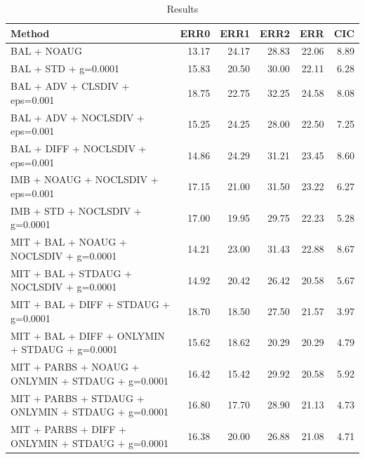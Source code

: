 \begin{table}
\caption{Results}
\label{tab:Results}
\begin{tabular}{lrrrrr}
\toprule
Method & ERR0 & ERR1 & ERR2 & ERR & CIC \\
\midrule
BAL + NOAUG & 13.17 & 24.17 & 28.83 & 22.06 & 8.89 \\
BAL + STD + g=0.0001 & 15.83 & 20.50 & 30.00 & 22.11 & 6.28 \\
BAL + ADV + CLSDIV + eps=0.001 & 18.75 & 22.75 & 32.25 & 24.58 & 8.08 \\
BAL + ADV + NOCLSDIV + eps=0.001 & 15.25 & 24.25 & 28.00 & 22.50 & 7.25 \\
BAL + DIFF + NOCLSDIV + eps=0.001 & 14.86 & 24.29 & 31.21 & 23.45 & 8.60 \\
IMB + NOAUG + NOCLSDIV + eps=0.001 & 17.15 & 21.00 & 31.50 & 23.22 & 6.27 \\
IMB + STD + NOCLSDIV + g=0.0001 & 17.00 & 19.95 & 29.75 & 22.23 & 5.28 \\
MIT + BAL + NOAUG + NOCLSDIV + g=0.0001 & 14.21 & 23.00 & 31.43 & 22.88 & 8.67 \\
MIT + BAL + STDAUG + NOCLSDIV + g=0.0001 & 14.92 & 20.42 & 26.42 & 20.58 & 5.67 \\
MIT + BAL + DIFF + STDAUG + g=0.0001 & 18.70 & 18.50 & 27.50 & 21.57 & 3.97 \\
MIT + BAL + DIFF + ONLYMIN + STDAUG + g=0.0001 & 15.62 & 18.62 & 20.29 & 20.29 & 4.79 \\
MIT + PARBS + NOAUG + ONLYMIN + STDAUG + g=0.0001 & 16.42 & 15.42 & 29.92 & 20.58 & 5.92 \\
MIT + PARBS + STDAUG + ONLYMIN + STDAUG + g=0.0001 & 16.80 & 17.70 & 28.90 & 21.13 & 4.73 \\
MIT + PARBS + DIFF + ONLYMIN + STDAUG + g=0.0001 & 16.38 & 20.00 & 26.88 & 21.08 & 4.71 \\
\bottomrule
\end{tabular}
\end{table}
